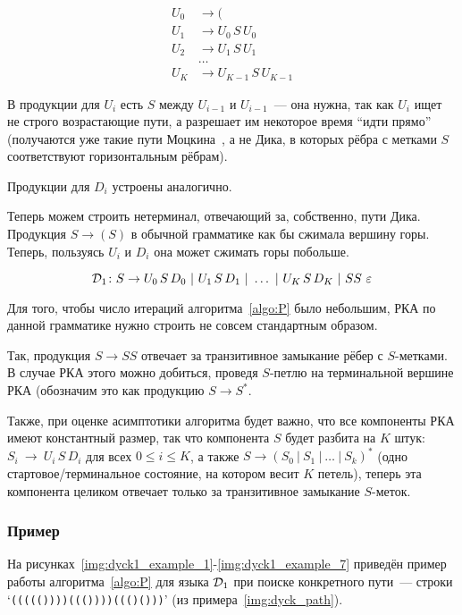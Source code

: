 \begin{align*}\label{eq:U}
  U_0 &\to ( \\
  U_1 &\to U_0\, S\, U_0 \\
  U_2 &\to U_1\, S\, U_1 \\
  &\dots \\
  U_K &\to U_{K-1}\, S\, U_{K-1} 
\end{align*}

В продукции для $U_i$ есть $S$ между $U_{i-1}$ и $U_{i-1}$~--- она нужна, так как $U_i$ ищет не строго возрастающие пути, а разрешает им некоторое время ``идти прямо'' (получаются уже такие пути Моцкина~\cite{Donaghey1977}, а не Дика, в которых рёбра с метками $S$ соответствуют горизонтальным рёбрам).

Продукции для $D_i$ устроены аналогично.

Теперь можем строить нетерминал, отвечающий за, собственно, пути Дика. Продукция $S \to ( S )$ в обычной грамматике как бы сжимала вершину горы. Теперь, пользуясь $U_i$ и $D_i$ она может сжимать горы побольше.

\vspace{-10pt}

\begin{equation}\label{eq:S}
  \mathcal{D}_1 \colon S \rightarrow U_0\, S\, D_0~|~U_1\, S\, D_1~|~ \dots ~|~U_K\, S\, D_K~|~SS~\varepsilon
\end{equation}

Для того, чтобы число итераций алгоритма~\ref{algo:P} было небольшим, РКА по данной грамматике нужно строить не совсем стандартным образом.

Так, продукция $S \to SS$ отвечает за транзитивное замыкание рёбер с $S$-метками. В случае РКА этого можно добиться, проведя $S$-петлю на терминальной вершине РКА (обозначим это как продукцию $S \to S^*$.

Также, при оценке асимптотики алгоритма будет важно, что все компоненты РКА имеют константный размер, так что компонента $S$ будет разбита на $K$ штук: $S_i~\to~U_i\,S \,D_i$ для всех $0 \le i \le K$, а также $S \to (S_0~|~S_1~|~ \dots ~|~ S_k)^*$ (одно стартовое/терминальное состояние, на котором весит $K$ петель), теперь эта компонента целиком отвечает только за транзитивное замыкание $S$-меток.

\subsubsection{Пример}

На рисунках~\ref{img:dyck1_example_1}-\ref{img:dyck1_example_7} приведён пример работы алгоритма~\ref{algo:P} для языка $\mathcal{D}_1$ при поиске конкретного пути~--- строки `\texttt{((((())))((())))((()()))}' (из примера~\ref{img:dyck_path}).

